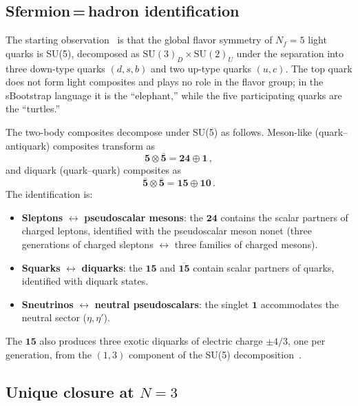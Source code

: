 \documentclass[prd,twocolumn,superscriptaddress,nofootinbib]{revtex4-2}
\begin{document}
\subsection{Sfermion\,=\,hadron identification}
\label{sec:identification}

The starting observation~\cite{Rivero2007spectroscopy,Rivero2009sboot}
is that the global flavor symmetry of $N_f=5$ light quarks is SU(5),
decomposed as $\text{SU}(3)_D \times \text{SU}(2)_U$ under the
separation into three down-type quarks $(d,s,b)$ and two up-type quarks
$(u,c)$.  The top quark does not form light composites and plays no role
in the flavor group; in the sBootstrap language it is the ``elephant,''
while the five participating quarks are the ``turtles.''

The two-body composites decompose under SU(5) as follows.  Meson-like
(quark--antiquark) composites transform as
\begin{equation}
  \mathbf{5}\otimes\bar{\mathbf{5}} = \mathbf{24}\oplus\mathbf{1}\,,
  \label{eq:mesons}
\end{equation}
and diquark (quark--quark) composites as
\begin{equation}
  \bar{\mathbf{5}}\otimes\bar{\mathbf{5}}
  = \mathbf{15}\oplus\mathbf{10}\,.
  \label{eq:diquarks}
\end{equation}
The identification is:
\begin{itemize}
\item \textbf{Sleptons} $\leftrightarrow$ \textbf{pseudoscalar mesons}:
  the $\mathbf{24}$ contains the scalar partners of charged leptons,
  identified with the pseudoscalar meson nonet (three generations of
  charged sleptons $\leftrightarrow$ three families of charged mesons).
\item \textbf{Squarks} $\leftrightarrow$ \textbf{diquarks}:
  the $\mathbf{15}$ and $\overline{\mathbf{15}}$ contain scalar
  partners of quarks, identified with diquark states.
\item \textbf{Sneutrinos} $\leftrightarrow$ \textbf{neutral pseudoscalars}:
  the singlet $\mathbf{1}$ accommodates the neutral sector
  ($\eta,\eta'$).
\end{itemize}
The $\mathbf{15}$ also produces three exotic diquarks of electric charge
$\pm 4/3$, one per generation, from the $(1,3)$ component of the SU(5)
decomposition~\cite{Rivero2011diquark}.

\subsection{Unique closure at $N=3$}
\label{sec:closure}
\end{document}
